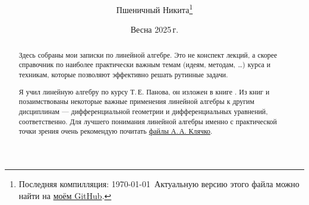 \documentclass[a4paper, twoside, leqno, 11pt]{article}
\begin{document}
\title{\bfseries\scshape\course}
\date{Весна 2025\,г.}
\author{Пшеничный Никита\thanks{Последняя компилляция: \today\ Актуальную версию этого файла можно найти на \href{https://github.com/pshenikita/Linear-Algebra}{моём GitHub}.}}

\maketitle
\begin{abstract}
	Здесь собраны мои записки по линейной алгебре. Это не конспект лекций, а скорее справочник по наиболее практически важным темам (идеям, методам, \ldots) курса и техникам, которые позволяют эффективно решать рутинные задачи.

	Я учил линейную алгебру по курсу Т.\,Е. Панова, он изложен в книге \cite{P24}. Из книг \cite{NT14} и \cite{A24} позаимствованы некоторые важные применения линейной алгебры к другим дисциплинам --- дифференциальной геометрии и дифференциальных уравнений, соответственно. Для лучшего понимания линейной алгебры именно с практической точки зрения очень рекомендую почитать \href{http://halgebra.math.msu.su/wiki/doku.php/klyachko-v24}{файлы А.\,А. Клячко}.

	
\end{abstract}

\tableofcontents


\end{document}
